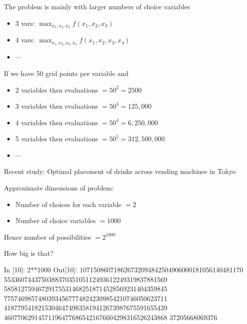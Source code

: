 \begin{frame}
    
    The problem is mainly with larger numbers of choice variables

    \begin{itemize}
        \item 3 vars: $\max_{x_1, x_2, x_3} f(x_1, x_2, x_3)$
        \item 4 vars: $\max_{x_1, x_2, x_3, x_4} f(x_1, x_2, x_3, x_4)$
        \item $\cdots$
    \end{itemize}

    If we have 50 grid points per variable and 
    
    \begin{itemize}
        \item 2 variables then evaluations $=50^2 = 2500$
        \item 3 variables then evaluations $=50^3 = 125,000$
        \item 4 variables then evaluations $=50^4 = 6,250,000$
        \item 5 variables then evaluations $=50^5 = 312,500,000$
        \item $\cdots$
    \end{itemize}

\end{frame}


\begin{frame}
    
    \Eg Recent study: Optimal placement of drinks across vending machines in
    Tokyo

    Approximate dimensions of problem:

    \begin{itemize}
        \item Number of choices for each variable $=2$
        \item Number of choice variables $=1000$
    \end{itemize}

    Hence number of possibilities $=2^{1000}$

    \vspace{1em}

    How big is that?

\end{frame}


\begin{frame}[fragile]
    
\begin{pythoncode}
In [10]: 2**1000
Out[10]:
107150860718626732094842504906000181056140481170
553360744375038837035105112493612249319837881569
585812759467291755314682518714528569231404359845
775746985748039345677748242309854210746050623711
418779541821530464749835819412673987675591655439
460770629145711964776865421676604298316526243868
37205668069376
\end{pythoncode}

\end{frame}


